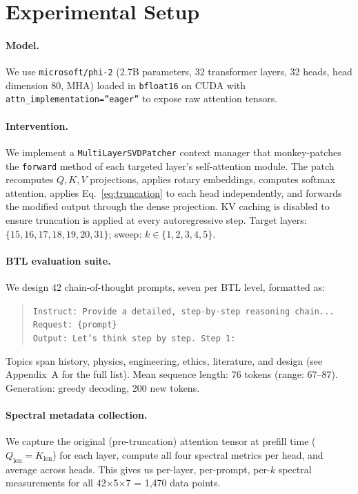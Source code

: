 \documentclass{article}
\begin{document}
\section{Experimental Setup}
\label{sec:setup}

\paragraph{Model.}
We use \texttt{microsoft/phi-2} (2.7B parameters, 32 transformer layers, 32 heads,
head dimension 80, MHA) loaded in \texttt{bfloat16} on CUDA with
\texttt{attn\_implementation=''eager''} to expose raw attention tensors.

\paragraph{Intervention.}
We implement a \texttt{MultiLayerSVDPatcher} context manager that monkey-patches
the \texttt{forward} method of each targeted layer's self-attention module.
The patch recomputes $Q, K, V$ projections, applies rotary embeddings, computes
softmax attention, applies Eq.~\eqref{eq:truncation} to each head independently,
and forwards the modified output through the dense projection.
KV caching is disabled to ensure truncation is applied at every autoregressive step.
Target layers: $\{15, 16, 17, 18, 19, 20, 31\}$; sweep: $k \in \{1, 2, 3, 4, 5\}$.

\paragraph{BTL evaluation suite.}
We design 42 chain-of-thought prompts, seven per BTL level, formatted as:
\begin{quote}
\small
\texttt{Instruct: Provide a detailed, step-by-step reasoning chain...\\
Request: \{prompt\}\\
Output: Let's think step by step. Step 1:}
\end{quote}
Topics span history, physics, engineering, ethics, literature, and design
(see Appendix~A for the full list).
Mean sequence length: 76 tokens (range: 67--87).
Generation: greedy decoding, 200 new tokens.

\paragraph{Spectral metadata collection.}
We capture the original (pre-truncation) attention tensor at prefill time
($Q_\text{len} = K_\text{len}$) for each layer, compute all four spectral metrics
per head, and average across heads.  This gives us per-layer, per-prompt,
per-$k$ spectral measurements for all 42$\times$5$\times$7 = 1,470 data points.
\end{document}
